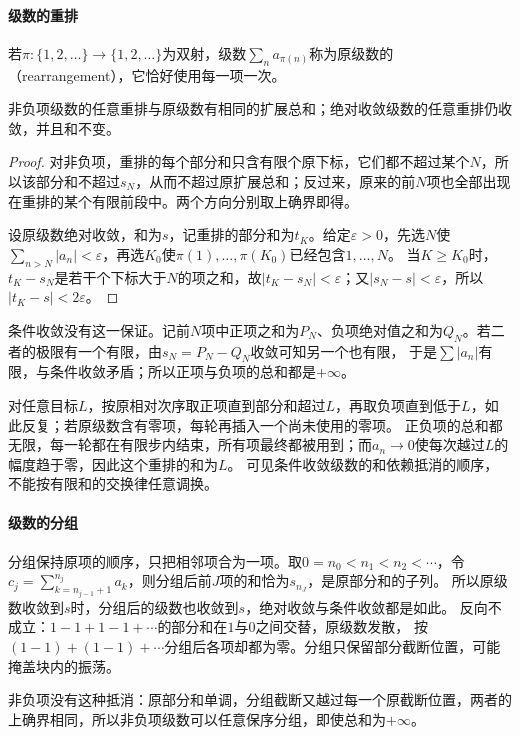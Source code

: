 \paragraph{级数的重排}
若$\pi:\{1,2,\ldots\}\to\{1,2,\ldots\}$为双射，级数$\sum_na_{\pi(n)}$称为原级数的（rearrangement），它恰好使用每一项一次。
\begin{theorem}[保持和的重排]
\label{thm:ru-rearrangement}
非负项级数的任意重排与原级数有相同的扩展总和；绝对收敛级数的任意重排仍收敛，并且和不变。
\end{theorem}
\begin{proof}
对非负项，重排的每个部分和只含有限个原下标，它们都不超过某个$N$，所以该部分和不超过$s_N$，从而不超过原扩展总和；反过来，原来的前$N$项也全部出现在重排的某个有限前段中。两个方向分别取上确界即得。

设原级数绝对收敛，和为$s$，记重排的部分和为$t_K$。给定$\varepsilon>0$，先选$N$使$\sum_{n>N}|a_n|<\varepsilon$，再选$K_0$使$\pi(1),\ldots,\pi(K_0)$已经包含$1,\ldots,N$。
当$K\geq K_0$时，$t_K-s_N$是若干个下标大于$N$的项之和，故$|t_K-s_N|<\varepsilon$；又$|s_N-s|<\varepsilon$，所以$|t_K-s|<2\varepsilon$。
\end{proof}

条件收敛没有这一保证。记前$N$项中正项之和为$P_N$、负项绝对值之和为$Q_N$。若二者的极限有一个有限，由$s_N=P_N-Q_N$收敛可知另一个也有限，
于是$\sum|a_n|$有限，与条件收敛矛盾；所以正项与负项的总和都是$+\infty$。

对任意目标$L$，按原相对次序取正项直到部分和超过$L$，再取负项直到低于$L$，如此反复；若原级数含有零项，每轮再插入一个尚未使用的零项。
正负项的总和都无限，每一轮都在有限步内结束，所有项最终都被用到；而$a_n\to0$使每次越过$L$的幅度趋于零，因此这个重排的和为$L$。
可见条件收敛级数的和依赖抵消的顺序，不能按有限和的交换律任意调换。

\paragraph{级数的分组}
分组保持原项的顺序，只把相邻项合为一项。取$0=n_0<n_1<n_2<\cdots$，令$c_j=\sum_{k=n_{j-1}+1}^{n_j}a_k$，则分组后前$J$项的和恰为$s_{n_J}$，是原部分和的子列。
所以原级数收敛到$s$时，分组后的级数也收敛到$s$，绝对收敛与条件收敛都是如此。
反向不成立：$1-1+1-1+\cdots$的部分和在$1$与$0$之间交替，原级数发散，
按$(1-1)+(1-1)+\cdots$分组后各项却都为零。分组只保留部分截断位置，可能掩盖块内的振荡。

非负项没有这种抵消：原部分和单调，分组截断又越过每一个原截断位置，两者的上确界相同，所以非负项级数可以任意保序分组，即使总和为$+\infty$。
